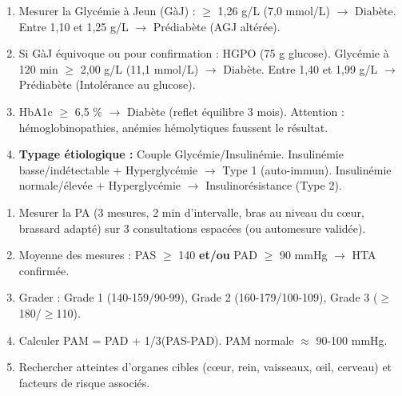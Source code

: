 \documentclass[11pt]{article}
\begin{document}
\begin{methode}
\begin{enumerate}
    \item Mesurer la Glycémie à Jeun (GàJ) : $\ge$ 1,26 g/L (7,0 mmol/L) $\rightarrow$ Diabète. Entre 1,10 et 1,25 g/L $\rightarrow$ Prédiabète (AGJ altérée).
    \item Si GàJ équivoque ou pour confirmation : HGPO (75 g glucose). Glycémie à 120 min $\ge$ 2,00 g/L (11,1 mmol/L) $\rightarrow$ Diabète. Entre 1,40 et 1,99 g/L $\rightarrow$ Prédiabète (Intolérance au glucose).
    \item HbA1c $\ge$ 6,5 \% $\rightarrow$ Diabète (reflet équilibre 3 mois). Attention : hémoglobinopathies, anémies hémolytiques faussent le résultat.
    \item \textbf{Typage étiologique :} Couple Glycémie/Insulinémie. Insulinémie basse/indétectable + Hyperglycémie $\rightarrow$ Type 1 (auto-immun). Insulinémie normale/élevée + Hyperglycémie $\rightarrow$ Insulinorésistance (Type 2).
\end{enumerate}
\end{methode}

\begin{methode}
\begin{enumerate}
    \item Mesurer la PA (3 mesures, 2 min d'intervalle, bras au niveau du cœur, brassard adapté) sur 3 consultations espacées (ou automesure validée).
    \item Moyenne des mesures : PAS $\ge$ 140 \textbf{et/ou} PAD $\ge$ 90 mmHg $\rightarrow$ HTA confirmée.
    \item Grader : Grade 1 (140-159/90-99), Grade 2 (160-179/100-109), Grade 3 ($\ge$180/$\ge$110).
    \item Calculer PAM = PAD + 1/3(PAS-PAD). PAM normale $\approx$ 90-100 mmHg.
    \item Rechercher atteintes d'organes cibles (cœur, rein, vaisseaux, œil, cerveau) et facteurs de risque associés.
\end{enumerate}
\end{methode}
\end{document}
